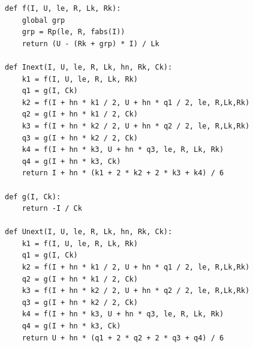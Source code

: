 \documentclass[a4paper,14pt]{extreport} %
\begin{document}
\begin{enumerate}
\begin{lstlisting}[caption=Решение системы уравнений методом Рунге-Кутта]
def f(I, U, le, R, Lk, Rk):
    global grp
    grp = Rp(le, R, fabs(I))
    return (U - (Rk + grp) * I) / Lk

def Inext(I, U, le, R, Lk, hn, Rk, Ck):
    k1 = f(I, U, le, R, Lk, Rk)
    q1 = g(I, Ck)
    k2 = f(I + hn * k1 / 2, U + hn * q1 / 2, le, R,Lk,Rk)
    q2 = g(I + hn * k1 / 2, Ck)
    k3 = f(I + hn * k2 / 2, U + hn * q2 / 2, le, R,Lk,Rk)
    q3 = g(I + hn * k2 / 2, Ck)
    k4 = f(I + hn * k3, U + hn * q3, le, R, Lk, Rk)
    q4 = g(I + hn * k3, Ck)
    return I + hn * (k1 + 2 * k2 + 2 * k3 + k4) / 6

def g(I, Ck):
    return -I / Ck

def Unext(I, U, le, R, Lk, hn, Rk, Ck):
    k1 = f(I, U, le, R, Lk, Rk)
    q1 = g(I, Ck)
    k2 = f(I + hn * k1 / 2, U + hn * q1 / 2, le, R,Lk,Rk)
    q2 = g(I + hn * k1 / 2, Ck)
    k3 = f(I + hn * k2 / 2, U + hn * q2 / 2, le, R,Lk,Rk)
    q3 = g(I + hn * k2 / 2, Ck)
    k4 = f(I + hn * k3, U + hn * q3, le, R, Lk, Rk)
    q4 = g(I + hn * k3, Ck)
    return U + hn * (q1 + 2 * q2 + 2 * q3 + q4) / 6
\end{lstlisting}

\end{enumerate}
\end{document}
